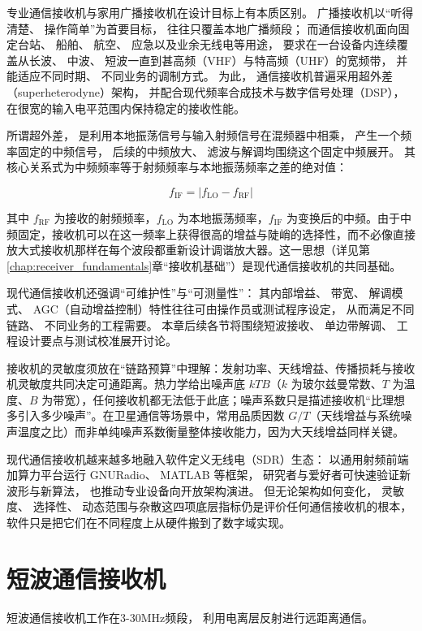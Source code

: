 专业通信接收机与家用广播接收机在设计目标上有本质区别。
广播接收机以“听得清楚、
操作简单”为首要目标，
往往只覆盖本地广播频段；
而通信接收机面向固定台站、
船舶、
航空、
应急以及业余无线电等用途，
要求在一台设备内连续覆盖从长波、
中波、
短波一直到甚高频（VHF）与特高频（UHF）的宽频带，
并能适应不同时期、
不同业务的调制方式。
为此，
通信接收机普遍采用超外差（superheterodyne）架构，
并配合现代频率合成技术与数字信号处理（DSP），
在很宽的输入电平范围内保持稳定的接收性能。

所谓超外差，
是利用本地振荡信号与输入射频信号在混频器中相乘，
产生一个频率固定的中频信号，
后续的中频放大、
滤波与解调均围绕这个固定中频展开。
其核心关系式为中频频率等于射频频率与本地振荡频率之差的绝对值：

\[
f_{\mathrm{IF}}=\left| f_{\mathrm{LO}}-f_{\mathrm{RF}} 
\right|
\]

其中 $f_{\mathrm{RF}}$ 为接收的射频频率，$f_{\mathrm{LO}}$ 为本地振荡频率，$f_{\mathrm{IF}}$ 为变换后的中频。由于中频固定，接收机可以在这一频率上获得很高的增益与陡峭的选择性，而不必像直接放大式接收机那样在每个波段都重新设计调谐放大器。这一思想（详见第\ref{chap:receiver_fundamentals}章“接收机基础”）是现代通信接收机的共同基础。

现代通信接收机还强调“可维护性”与“可测量性”：
其内部增益、
带宽、
解调模式、
AGC（自动增益控制）特性往往可由操作员或测试程序设定，
从而满足不同链路、
不同业务的工程需要。
本章后续各节将围绕短波接收、
单边带解调、
工程设计要点与测试校准展开讨论。

接收机的灵敏度须放在“链路预算”中理解：发射功率、天线增益、传播损耗与接收机灵敏度共同决定可通距离。热力学给出噪声底 $kTB$（$k$ 为玻尔兹曼常数、$T$ 为温度、$B$ 为带宽），任何接收机都无法低于此底；噪声系数只是描述接收机“比理想多引入多少噪声”。在卫星通信等场景中，常用品质因数 $G/T$（天线增益与系统噪声温度之比）而非单纯噪声系数衡量整体接收能力，因为大天线增益同样关键。

现代通信接收机越来越多地融入软件定义无线电（SDR）生态：
以通用射频前端加算力平台运行 GNURadio、
MATLAB 等框架，
研究者与爱好者可快速验证新波形与新算法，
也推动专业设备向开放架构演进。
但无论架构如何变化，
灵敏度、
选择性、
动态范围与杂散这四项底层指标仍是评价任何通信接收机的根本，
软件只是把它们在不同程度上从硬件搬到了数字域实现。

\section{短波通信接收机}
\label{sec:shortwave_receiver}

短波通信接收机工作在3-30MHz频段，
利用电离层反射进行远距离通信。

